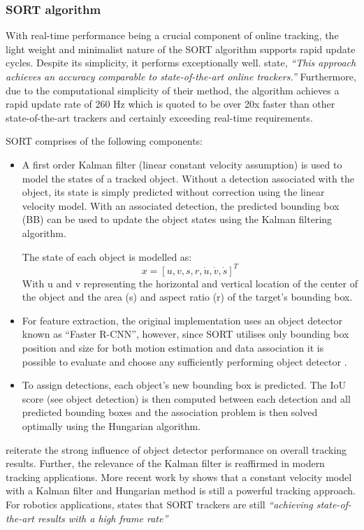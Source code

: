 \documentclass[a4paper,twoside,12pt]{report}
\begin{document}
\subsubsection{SORT algorithm}

With real-time performance being a crucial component of online tracking, the light weight and minimalist nature of the SORT algorithm supports rapid update cycles. Despite its simplicity, it performs exceptionally well. \cite{sort} state, \textit{``This approach achieves an accuracy comparable to state-of-the-art online trackers.''} Furthermore, due to the computational simplicity of their method, the algorithm achieves a rapid update rate of 260 Hz which is quoted to be over 20x faster than other state-of-the-art trackers and certainly exceeding real-time requirements.

SORT comprises of the following components:
\begin{itemize}
	\item A first order Kalman filter (linear constant velocity assumption) is used to model the states of a tracked object. Without a detection associated with the object, its state is simply predicted without correction using the linear velocity model. With an associated detection, the predicted bounding box (BB) can be used to update the object states using the Kalman filtering algorithm.

	The state of each object is modelled as:
\begin{equation}
x = [u,v,s,r,\dot{u},\dot{v},\dot{s}]^T
\end{equation}
With u and v representing the horizontal and vertical location of the center of the object and the area (s) and aspect ratio (r) of the target’s bounding box.

	\item For feature extraction, the original implementation uses an object detector known as ``Faster R-CNN'', however, since SORT utilises only bounding box position and size for both motion estimation and data association it is possible to evaluate and choose any sufficiently performing object detector \citep{sort}.
	\item To assign detections, each object's new bounding box is predicted. The IoU score (see object detection) is then computed between each detection and all predicted bounding boxes and the association problem is then solved optimally using the Hungarian algorithm.
\end{itemize}

\cite{sort} reiterate the strong influence of object detector performance on overall tracking results. Further, the relevance of the Kalman filter is reaffirmed in modern tracking applications. More recent work by \cite{sort++} shows that a constant velocity model with a Kalman filter and Hungarian method is still a powerful tracking approach. For robotics applications, \cite{sortrob} states that SORT trackers are still \textit{``achieving state-of-the-art results with a high frame rate''} 
\end{document}
